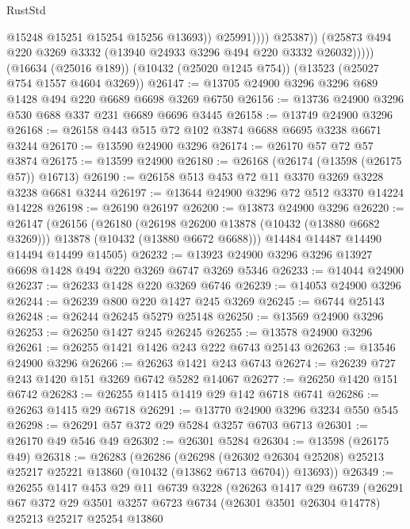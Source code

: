 \begin{lexlean}{RustStd}
\begin{coremodule}
                          @15248
                          @15251
                          @15254
                          @15256
                          @13693))
                      @25991))))
              @25387))
          (@25873 @494 @220 @3269 @3332 (@13940 @24933 @3296 @494 @220 @3332 @26032)))))
    (@16634 (@25016 @189))
    (@10432 (@25020 @1245 @754))
    (@13523 (@25027 @754 @1557 @4604 @3269))
@26147 := @13705 @24900 @3296 @3296 @689 @1428 @494 @220 @6689 @6698 @3269 @6750
@26156 := @13736 @24900 @3296 @530 @688 @337 @231 @6689 @6696 @3445
@26158 := @13749 @24900 @3296
@26168 := @26158 @443 @515 @72 @102 @3874 @6688 @6695 @3238 @6671 @3244
@26170 := @13590 @24900 @3296
@26174 := @26170 @57 @72 @57 @3874
@26175 := @13599 @24900
@26180 := @26168 (@26174 (@13598 (@26175 @57)) @16713)
@26190 := @26158 @513 @453 @72 @11 @3370 @3269 @3228 @3238 @6681 @3244
@26197 := @13644 @24900 @3296 @72 @512 @3370 @14224 @14228
@26198 := @26190 @26197
@26200 := @13873 @24900 @3296
@26220 := @26147
    (@26156
      (@26180
        (@26198 @26200 @13878 (@10432 (@13880 @6682 @3269)))
        @13878
        (@10432 (@13880 @6672 @6688)))
      @14484
      @14487
      @14490
      @14494
      @14499
      @14505)
@26232 := @13923 @24900 @3296 @3296 @13927 @6698 @1428 @494 @220 @3269 @6747 @3269 @5346
@26233 := @14044 @24900
@26237 := @26233 @1428 @220 @3269 @6746
@26239 := @14053 @24900 @3296
@26244 := @26239 @800 @220 @1427 @245 @3269
@26245 := @6744 @25143
@26248 := @26244 @26245 @5279 @25148
@26250 := @13569 @24900 @3296
@26253 := @26250 @1427 @245 @26245
@26255 := @13578 @24900 @3296
@26261 := @26255 @1421 @1426 @243 @222 @6743 @25143
@26263 := @13546 @24900 @3296
@26266 := @26263 @1421 @243 @6743
@26274 := @26239 @727 @243 @1420 @151 @3269 @6742 @5282 @14067
@26277 := @26250 @1420 @151 @6742
@26283 := @26255 @1415 @1419 @29 @142 @6718 @6741
@26286 := @26263 @1415 @29 @6718
@26291 := @13770 @24900 @3296 @3234 @550 @545
@26298 := @26291 @57 @372 @29 @5284 @3257 @6703 @6713
@26301 := @26170 @49 @546 @49
@26302 := @26301 @5284
@26304 := @13598 (@26175 @49)
@26318 := @26283
    (@26286
      (@26298
        (@26302 @26304 @25208)
        @25213
        @25217
        @25221
        @13860
        (@10432 (@13862 @6713 @6704))
        @13693))
@26349 := @26255
    @1417
    @453
    @29
    @11
    @6739
    @3228
    (@26263
      @1417
      @29
      @6739
      (@26291
        @67
        @372
        @29
        @3501
        @3257
        @6723
        @6734
        (@26301 @3501 @26304 @14778)
        @25213
        @25217
        @25254
        @13860

\end{coremodule}
\end{lexlean}
